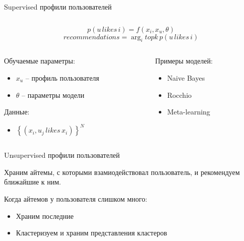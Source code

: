 \documentclass[11pt,aspectratio=169]{beamer}
\begin{document}
\begin{frame}{Supervised профили пользователей}

\begin{columns}
\begin{column}{0.15\textwidth} 
\end{column}
\begin{column}{0.6\textwidth} 
\begin{tcolorbox}[colback=info!5,colframe=info!80,title=Модель]
\[
p(u \, likes \, i) = f(x_i, x_u, \theta)
\]
\[
recommendations = \arg_i topk \, p(u \, likes \, i)
\]
\end{tcolorbox}
\end{column}
\begin{column}{0.15\textwidth} 
\end{column}
\end{columns}

\vfill

\begin{columns}
\begin{column}{0.45\textwidth}   
   Обучаемые параметры:
  \begin{itemize}
    \item $x_u$ -- профиль пользователя
    \item $\theta$ -- параметры модели
  \end{itemize}
  
  Данные:
  \begin{itemize}
    \item $\left\{ (x_i, u_j \, likes \, x_i) \right\}^N$
  \end{itemize}

\end{column}

\begin{column}{0.45\textwidth}
  Примеры моделей:
  \begin{itemize}
  \item Naive Bayes
  \item Rocchio
  \item Meta-learning
  \end{itemize}
    
\end{column}
\end{columns}

\end{frame}

\begin{frame}{Unsupervised профили пользователей}

\begin{tcolorbox}[colback=info!5,colframe=info!80,title=Идея]
Храним айтемы, с которыми взамиодействовал пользователь, и рекомендуем ближайшие к ним.
\end{tcolorbox}

\vfill

Когда айтемов у пользователя слишком много:
\begin{itemize}
\item Храним последние
\item Кластеризуем и храним представления кластеров \cite{PINNERSAGE}
\end{itemize} 

\end{frame}
\end{document}
